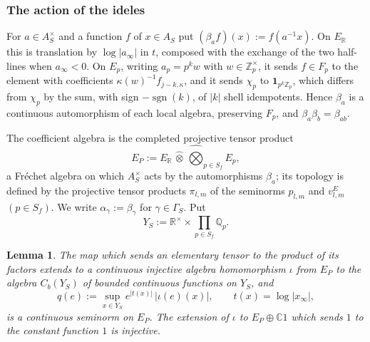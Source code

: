 \documentclass[11pt]{amsart}
\newtheorem{lemma}[theorem]{Lemma}
\theoremstyle{definition}
\theoremstyle{remark}
\newcommand{\C}{\mathbb C}
\newcommand{\R}{\mathbb R}
\newcommand{\Z}{\mathbb Z}
\newcommand{\Q}{\mathbb Q}
\newcommand{\sgn}{\operatorname{sgn}}
\begin{document}
\subsubsection*{The action of the ideles}
For $a\in A_S^{\times}$ and a function $f$ of $x\in A_S$ put
$(\beta_af)(x):=f(a^{-1}x)$.  On $E_{\R}$ this is translation by
$\log|a_{\infty}|$ in $t$, composed with the exchange of the two half-lines
when $a_{\infty}<0$.  On $E_p$, writing $a_p=p^{k}w$ with $w\in\Z_p^{\times}$,
it sends $f\in F_p$ to the element with coefficients
$\kappa(w)^{-1}f_{j-k,\kappa}$, and it sends $\chi_p$ to
$\mathbf 1_{p^{k}\Z_p}$, which differs from $\chi_p$ by the sum, with sign
$-\sgn(k)$, of $|k|$ shell idempotents.  Hence $\beta_a$ is a continuous
automorphism of each local algebra, preserving $F_p$, and
$\beta_a\beta_b=\beta_{ab}$.

The coefficient algebra is the completed projective tensor product
\begin{equation}\label{eq:coeff}
E_P:=E_{\R}\,\widehat\otimes\,\widehat\bigotimes_{p\in S_f}E_p ,
\end{equation}
a Fr\'echet algebra on which $A_S^{\times}$ acts by the automorphisms
$\beta_a$; its topology is defined by the projective tensor products
$\pi_{l,m}$ of the seminorms $p_{l,m}$ and $v^{E}_{l,m}$ $(p\in S_f)$.  We
write $\alpha_{\gamma}:=\beta_{\gamma}$ for $\gamma\in\Gamma_S$.  Put
\[
Y_S:=\R^{\times}\times\prod_{p\in S_f}\Q_p .
\]

\begin{lemma}\label{lem:functions}
The map which sends an elementary tensor to the product of its factors extends
to a continuous injective algebra homomorphism $\iota$ from $E_P$ to the
algebra $C_b(Y_S)$ of bounded continuous functions on $Y_S$, and
\[
q(e):=\sup_{x\in Y_S}e^{|t(x)|}\,|\iota(e)(x)|,\qquad t(x)=\log|x_{\infty}|,
\]
is a continuous seminorm on $E_P$.  The extension of $\iota$ to
$E_P\oplus\C1$ which sends $1$ to the constant function $1$ is injective.
\end{lemma}
\end{document}
